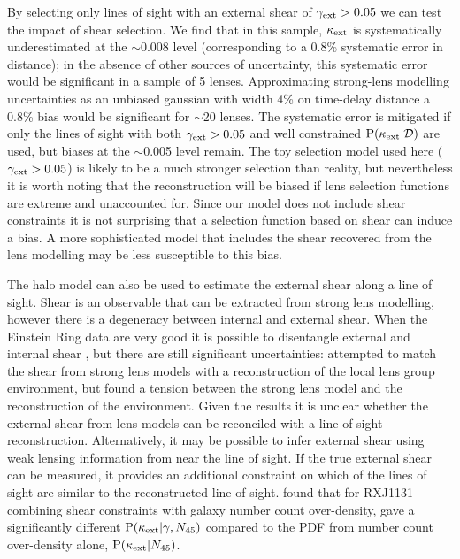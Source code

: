 \documentclass[useAMS,usenatbib,a4paper]{mn2e}
\begin{document}
By selecting only lines of sight with an external shear of $\gamma_{\rm ext}>0.05$ we
can test the impact of shear selection. We find that in this sample, $\kappa_{\rm ext}$
is systematically underestimated at the $\sim$0.008 level (corresponding to a
0.8\% systematic error in distance); in the absence of other sources of uncertainty, this
systematic error would be significant in a sample of 5 lenses. Approximating strong-lens
modelling uncertainties as an unbiased gaussian with width 4\% on time-delay distance a 0.8\% bias would be
significant for $\sim$20 lenses. 
The systematic error is mitigated if only
the lines of sight with both $\gamma_{\rm ext}>0.05$ and well constrained ${\rm P}(\kappa_{\rm ext}|{\mathcal{D}})$ are
used, but biases at the $\sim$0.005 level remain. The
toy selection model used here ($\gamma_{\rm ext}>0.05$) is likely to be a much
stronger selection than reality, but nevertheless it is worth noting that the
reconstruction \proceedure will be biased if lens selection functions are
extreme and unaccounted for. Since our model does not
include shear constraints it is not surprising that a selection function based on shear
can induce a bias. A more sophisticated model that includes the shear
recovered from the lens modelling may be less susceptible to this bias.

The halo model can also be used to estimate the external shear
along a line of sight. Shear is an observable that can be extracted from
strong lens modelling, however there is a degeneracy between internal and
external shear. When the Einstein Ring data are very good it is possible to
disentangle external and internal shear \citep[\eg][]{SuyuEtal2010}, but there are
still significant uncertainties: \citet{WongEtal2011} attempted to match the
shear from strong lens models with a reconstruction of the local lens group
environment, but found a tension between the strong lens model and the
reconstruction of the environment. Given the \citet{WongEtal2011} results
it is unclear whether the external shear from lens models can be
reconciled with a line of sight reconstruction. Alternatively, it may be possible 
to infer external shear using weak lensing information from near the line of sight. 
If the true external shear can be
measured, it provides an additional constraint on which of the \MS lines of
sight are similar to the reconstructed line of sight. \citet{SuyuEtal2012}
found that for RXJ1131 combining shear constraints with galaxy number count
over-density, gave a significantly different ${\rm P}(\kappa_{\rm ext}|\gamma,N_{45})$
compared to the PDF from number count over-density alone,
${\rm P}(\kappa_{\rm ext}|N_{45})$.
\end{document}
